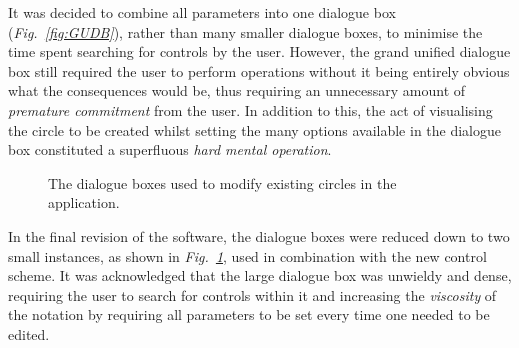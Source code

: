 \documentclass[12pt,twoside,notitlepage,xetex]{report}
\begin{document}
It was decided to combine all parameters into one dialogue box (\emph{Fig.~\ref{fig:GUDB}}), rather than many smaller dialogue boxes, to minimise the time spent searching for controls by the user.  However, the grand unified dialogue box still required the user to perform operations without it being entirely obvious what the consequences would be, thus requiring an unnecessary amount of \emph{premature commitment} from the user.  In addition to this, the act of visualising the circle to be created whilst setting the many options available in the dialogue box constituted a superfluous \emph{hard mental operation}.

\begin{center}
\begin{figure}[H]
\begin{center}
\end{center}
\caption{The dialogue boxes used to modify existing circles in the application.}
\label{fig:Dialogues}
\end{figure}
\end{center}

In the final revision of the software, the dialogue boxes were reduced down to two small instances, as shown in \emph{Fig.~\ref{fig:Dialogues}}, used in combination with the new control scheme.  It was acknowledged that the large dialogue box was unwieldy and dense, requiring the user to search for controls within it and increasing the \emph{viscosity} of the notation by requiring all parameters to be set every time one needed to be edited.
\end{document}
